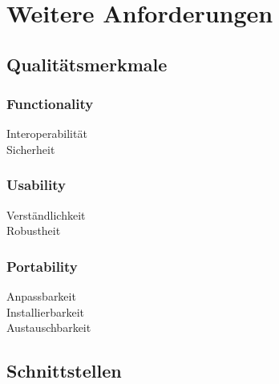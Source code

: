\section{Weitere Anforderungen}

	\subsection{Qualitätsmerkmale}


		\subsubsection{Functionality}
		\begin{description}
			\item[Interoperabilität] 
			\item[Sicherheit] 
		\end{description}

		\subsubsection{Usability}
		\begin{description}
			\item[Verständlichkeit] 
			\item[Robustheit] 
		\end{description}

		\subsubsection{Portability}
		\begin{description}
			\item[Anpassbarkeit] 
			\item[Installierbarkeit]
			\item[Austauschbarkeit] 
		\end{description}

	\subsection{Schnittstellen}